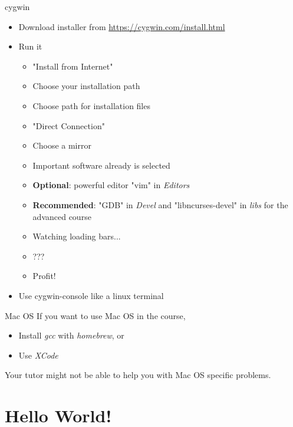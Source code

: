 \begin{frame}{cygwin}
	\begin{itemize}
		\item Download installer from \url{https://cygwin.com/install.html}
		\item Run it
		\begin{itemize}
			\item "Install from Internet"
			\item Choose your installation path
			\item Choose path for installation files
			\item "Direct Connection"
			\item Choose a mirror
			\item Important software already is selected
			\item \textbf{Optional}: powerful editor "vim" in \textit{Editors}
			\item \textbf{Recommended}: "GDB" in \textit{Devel} and "libncurses-devel" in \textit{libs} for the advanced course
			\item Watching loading bars...
			\item ???
			\item Profit!
		\end{itemize}
		\item Use cygwin-console like a linux terminal
	\end{itemize}
\end{frame}
\begin{frame}{Mac OS}
	If you want to use Mac OS in the course,
	\begin{itemize}
		\item Install \textit{gcc} with \textit{homebrew}, or
		\item Use \textit{XCode}
	\end{itemize}
	\bigskip
	Your tutor might not be able to help you with Mac OS specific problems. 
\end{frame}
\section{Hello World!}
